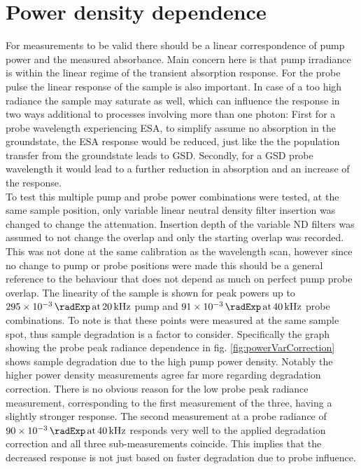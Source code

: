 \documentclass[twoside,openright]{scrreprt}
\def\pumpExp#1{\ensuremath{\SI{#1}{\radExp}\,\mathrm{at}\, \SI{20}{\kilo\hertz}}}
\def\probeExp#1{\ensuremath{\SI{#1}{\radExp}\,\mathrm{at}\, \SI{40}{\kilo\hertz}}}
\begin{document}
\section{Power density dependence}\label{sec:powerVar}
For measurements to be valid there should be a linear correspondence of pump power and the measured absorbance. Main concern here is that pump irradiance is within the linear regime of the transient absorption response. For the probe pulse the linear response of the sample is also important. In case of a too high radiance the sample may saturate as well, which can influence the response in two ways additional to processes involving more than one photon: First for a probe wavelength experiencing ESA, to simplify assume no absorption in the groundstate, the ESA response would be reduced, just like the the population transfer from the groundstate leads to GSD. Secondly, for a GSD probe wavelength it would lead to a further reduction in absorption  and an increase of the response.\\
To test this multiple pump and probe power combinations were tested, at the same sample position, only variable linear neutral density filter insertion was changed to change the attenuation. Insertion depth of the variable ND filters was assumed to not change the overlap and only the starting overlap was recorded. This was not done at the same calibration as the wavelength scan, however since no change to pump or probe positions were made this should be a general reference to the behaviour that does not depend as much on perfect pump probe overlap. The linearity of the sample is shown for peak powers up to \pumpExp{295e-3} pump and \probeExp{91e-3} probe combinations. To note is that these points were measured at the same sample spot, thus sample degradation is a factor to consider. Specifically the graph showing the probe peak radiance dependence in fig. \ref{fig:powerVarCorrection} shows sample degradation due to the high pump power density. Notably the higher power density measurements agree far more regarding degradation correction. There is no obvious reason for the low probe peak radiance measurement, corresponding to the first measurement of the three, having a slightly stronger response. The second measurement at a probe radiance of \probeExp{90e-3} responds very well to the applied degradation correction and all three sub-measurements coincide. This implies that the decreased response is not just based on faster degradation due to probe influence.
\end{document}
